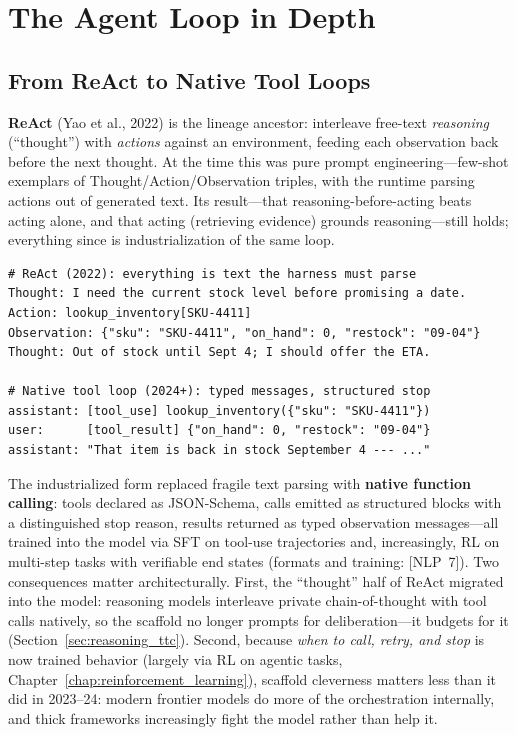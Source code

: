 \section{The Agent Loop in Depth}
\label{sec:agent_loop}

\subsection{From ReAct to Native Tool Loops}

\textbf{ReAct} (Yao et al., 2022) is the lineage ancestor: interleave free-text \textit{reasoning} (``thought'') with \textit{actions} against an environment, feeding each observation back before the next thought. At the time this was pure prompt engineering---few-shot exemplars of Thought/Action/Observation triples, with the runtime parsing actions out of generated text. Its result---that reasoning-before-acting beats acting alone, and that acting (retrieving evidence) grounds reasoning---still holds; everything since is industrialization of the same loop.

\begin{lstlisting}
# ReAct (2022): everything is text the harness must parse
Thought: I need the current stock level before promising a date.
Action: lookup_inventory[SKU-4411]
Observation: {"sku": "SKU-4411", "on_hand": 0, "restock": "09-04"}
Thought: Out of stock until Sept 4; I should offer the ETA.

# Native tool loop (2024+): typed messages, structured stop
assistant: [tool_use] lookup_inventory({"sku": "SKU-4411"})
user:      [tool_result] {"on_hand": 0, "restock": "09-04"}
assistant: "That item is back in stock September 4 --- ..."
\end{lstlisting}

The industrialized form replaced fragile text parsing with \textbf{native function calling}: tools declared as JSON-Schema, calls emitted as structured blocks with a distinguished stop reason, results returned as typed observation messages---all trained into the model via SFT on tool-use trajectories and, increasingly, RL on multi-step tasks with verifiable end states (formats and training: [NLP~7]). Two consequences matter architecturally. First, the ``thought'' half of ReAct migrated into the model: reasoning models interleave private chain-of-thought with tool calls natively, so the scaffold no longer prompts for deliberation---it budgets for it (Section~\ref{sec:reasoning_ttc}). Second, because \textit{when to call, retry, and stop} is now trained behavior (largely via RL on agentic tasks, Chapter~\ref{chap:reinforcement_learning}), scaffold cleverness matters less than it did in 2023--24: modern frontier models do more of the orchestration internally, and thick frameworks increasingly fight the model rather than help it.

